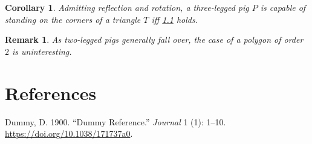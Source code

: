 \documentclass[
]{article}
\newlength{\cslhangindent}
\newlength{\cslentryspacingunit} %
\newenvironment{CSLReferences}[2] %
 {%
  \setlength{\parindent}{0pt}
  \ifodd #1
  \let\oldpar\par
  \def\par{\hangindent=\cslhangindent\oldpar}
  \fi
  \setlength{\parskip}{#2\cslentryspacingunit}
 }%
 {}
\theoremstyle{plain}
\theoremstyle{plain}
\theoremstyle{plain}
\theoremstyle{plain}
\newtheorem{corollary}[theorem]{Corollary}
\theoremstyle{plain}
\newtheorem*{remark}{Remark}
\theoremstyle{exercise}
\theoremstyle{note}
\theoremstyle{break}
\theoremstyle{citing}
\theoremstyle{plain}
\begin{document}
\begin{corollary}

Admitting reflection and rotation, a three-legged pig \(P\) is capable
of standing on the corners of a triangle \(T\) iff
\protect\hyperlink{sdq}{1.1} holds.

\end{corollary}

\begin{remark}

As two-legged pigs generally fall over, the case of a polygon of order
\(2\) is uninteresting.

\end{remark}

\hypertarget{references}{%
\section*{References}\label{references}}

\hypertarget{refs}{}
\begin{CSLReferences}{1}{0}
\leavevmode{}%
Dummy, D. 1900. {``Dummy Reference.''} \emph{Journal} 1 (1): 1--10.
\url{https://doi.org/10.1038/171737a0}.

\end{CSLReferences}
\end{document}
